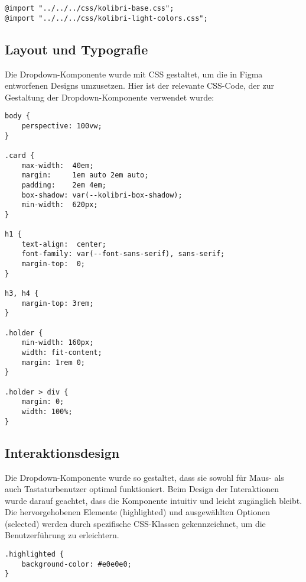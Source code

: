\begin{lstlisting}[style = htmlcssjs, caption = CSS Imports, label = code:cssImports]
@import "../../../css/kolibri-base.css";
@import "../../../css/kolibri-light-colors.css";
\end{lstlisting}


\subsection{Layout und Typografie}

Die Dropdown-Komponente wurde mit CSS gestaltet, um die in Figma entworfenen Designs umzusetzen. 
Hier ist der relevante CSS-Code, der zur Gestaltung der Dropdown-Komponente verwendet wurde:

\begin{lstlisting}[style = htmlcssjs, caption = style.css der Demo-Page, label = code:styleDemoPage]
body {
    perspective: 100vw;
}

.card {
    max-width:  40em;
    margin:     1em auto 2em auto;
    padding:    2em 4em;
    box-shadow: var(--kolibri-box-shadow);
    min-width:  620px;
}

h1 {
    text-align:  center;
    font-family: var(--font-sans-serif), sans-serif;
    margin-top:  0;
}

h3, h4 {
    margin-top: 3rem;
}

.holder {
    min-width: 160px;
    width: fit-content;
    margin: 1rem 0;
}

.holder > div {
    margin: 0;
    width: 100%;
}
\end{lstlisting}


\subsection{Interaktionsdesign}

Die Dropdown-Komponente wurde so gestaltet, dass sie sowohl für Maus- als auch Tastaturbenutzer optimal funktioniert. 
Beim Design der Interaktionen wurde darauf geachtet, dass die Komponente intuitiv und leicht zugänglich bleibt. 
Die hervorgehobenen Elemente (highlighted) und ausgewählten Optionen (selected) werden durch spezifische CSS-Klassen gekennzeichnet, um die Benutzerführung zu erleichtern.

\begin{lstlisting}[style = htmlcssjs, caption = Style Beispiel für Zustand Highlight, label = code:styleExample]
.highlighted {
    background-color: #e0e0e0;
}
\end{lstlisting}


